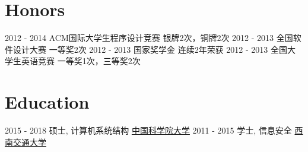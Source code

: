 \documentclass[a4paper]{twentysecondcv} %
\begin{document}
\section{Honors}
\begin{twenty}
	\twentyitemthree
	{2012 - 2014}
	{ACM国际大学生程序设计竞赛}
	{银牌2次，铜牌2次}
	\twentyitemthree
	{2012 - 2013}
	{全国软件设计大赛}
	{一等奖2次}
	\twentyitemthree
	{2012 - 2013}
	{国家奖学金}
	{连续2年荣获}
	\twentyitemthree
	{2012 - 2013}
	{全国大学生英语竞赛}
	{一等奖1次，三等奖2次}
\end{twenty}


\section{Education}

\begin{twenty} %
	\twentyitemthree
	{2015 - 2018}
	{硕士, 计算机系统结构}
	{\href{http://english.cas.cn/}{中国科学院大学}}
	\twentyitemthree
	{2011 - 2015}
	{学士, 信息安全}
	{\href{http://english.swjtu.edu.cn/}{西南交通大学}}
\end{twenty}
\end{document}

